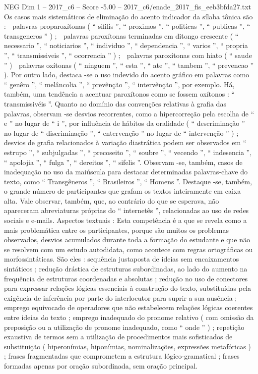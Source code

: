 \begin{textsample}{NEG Dim 1 – 2017\_c6 – Score -5.00 – 2017\_c6/enade\_2017\_fis\_eeb3bfda27.txt}
Os casos mais sistemáticos de eliminação do acento indicador da sílaba tônica são :  palavras proparoxítonas ( “ sifilis ”, “ proximos ”, “ politicas ”, “ publicas ”, “ transgeneros ” ) ;  palavras paroxítonas terminadas em ditongo crescente ( “ necessario ”, “ noticiarios ”, “ individuo ”, “ dependencia ”, “ varios ”, “ propria ”, “ transmissiveis ”, “ ocorrencia ” ) ;  palavras paroxítonas com hiato ( “ saude ” )  palavras oxítonas ( “ ninguem ”, “ esta ”, “ ate ”, “ tambem ”, “ prevencao ” ).
Por outro lado, destaca -se o uso indevido do acento gráfico em palavras como “ genêro ”, “ melâncolia ”, “ prevênção ”, “ intervênção ”, por exemplo.
Há, também, uma tendência a acentuar paroxítonos como se fossem oxítonos : “ transmissivéis ”.
Quanto ao domínio das convenções relativas à grafia das palavras, observam -se desvios recorrentes, como a hipercorreção pela escolha de “ e ” no lugar de “ i ”, por influência de hábitos da oralidade ( “ descriminação ” no lugar de “ discriminação ”, “ entervenção ” no lugar de “ intervenção ” ) ; desvios de grafia relacionados à variação diastrática podem ser observados em “ estrupo ”, “ subjulgadas ”, “ precoseito ”, “ soubre ”, “ vecendo ”, “ indesencia ”, “ apolojia ”, “ fulga ”, “ dereitos ”, “ sifelis ”.
Observam -se, também, casos de inadequação no uso da maiúscula para destacar determinadas palavras-chave do texto, como “ Transgêneros ”, “ Brasileiros ”, “ Homens ”.
Destaque -se, também, o grande número de participantes que grafam os textos inteiramente em caixa alta.
Vale observar, também, que, ao contrário do que se esperava, não apareceram abreviaturas próprias do “ internetês ”, relacionadas ao uso de redes sociais e e-mails.
Aspectos textuais : Esta competência é a que se revela como a mais problemática entre os participantes, porque são muitos os problemas observados, desvios acumulados durante toda a formação do estudante e que não se resolvem com um estudo autodidata, como acontece com regras ortográficas ou morfossintáticas.
São eles : sequência justaposta de ideias sem encaixamentos sintáticos ; redução drástica de estruturas subordinadas, ao lado do aumento na frequência de estruturas coordenadas e absolutas ; redução no uso de conectores para expressar relações lógicas essenciais à construção do texto, substituídas pela exigência de inferência por parte do interlocutor para suprir a sua ausência ; emprego equivocado de operadores que não estabelecem relações lógicas coerentes entre ideias do texto ; emprego inadequado do pronome relativo ( com omissão da preposição ou a utilização de pronome inadequado, como “ onde ” ) ; repetição exaustiva de termos sem a utilização de procedimentos mais sofisticados de substituição ( hiperonímias, hiponímias, nominalizações, expressões metafóricas ) ; frases fragmentadas que comprometem a estrutura lógico-gramatical ; frases formadas apenas por oração subordinada, sem oração principal.

\end{textsample}
